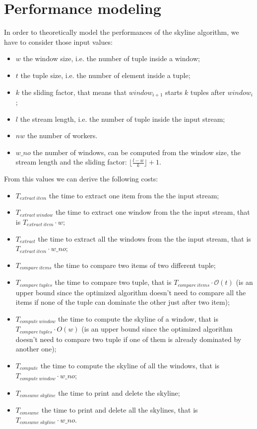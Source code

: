\section{Performance modeling}

In order to theoretically model the performances of the skyline algorithm, we have to consider those input values:
\begin{itemize}
    \item $w$ the window size, i.e. the number of tuple inside a window;
    \item $t$ the tuple size, i.e. the number of element inside a tuple;
    \item $k$ the sliding factor, that means that $window_{i+1}$ starts $k$ tuples after $window_i$;
    \item $l$ the stream length, i.e. the number of tuple inside the input stream;
    \item $nw$ the number of workers.
    \item $w\_no$ the number of windows, can be computed from the window size, the stream length and the sliding factor: $\lfloor\frac{l-w}{k}\rfloor+1$.
\end{itemize}

\bigskip\noindent
From this values we can derive the following costs:
\begin{itemize}
    \item $T_{extract\ item}$ the time to extract one item from the the input stream;
    \item $T_{extract\ window}$ the time to extract one window from the the input stream, that is $T_{extract\ item} \cdot w$;
    \item $T_{extract}$ the time to extract all the windows from the the input stream, that is $T_{extract\ item} \cdot w\_no$;
    \item $T_{compare\ items}$ the time to compare two items of two different tuple;
    \item $T_{compare\ tuples}$ the time to compare two tuple, that is $T_{compare\ items} \cdot \mathcal{O}(t)$ (is an upper bound since the optimized algorithm doesn't need to compare all the items if none of the tuple can dominate the other just after two item);
    \item $T_{compute\ window}$ the time to compute the skyline of a window, that is $T_{compare\ tuples} \cdot O(w)$ (is an upper bound since the optimized algorithm doesn't need to compare two tuple if one of them is already dominated by another one);
    \item $T_{compute}$ the time to compute the skyline of all the windows, that is $T_{compute\ window} \cdot w\_no$;
    \item $T_{consume\ skyline}$ the time to print and delete the skyline;
    \item $T_{consume}$ the time to print and delete all the skylines, that is $T_{consume\ skyline} \cdot w\_no$.
\end{itemize}


